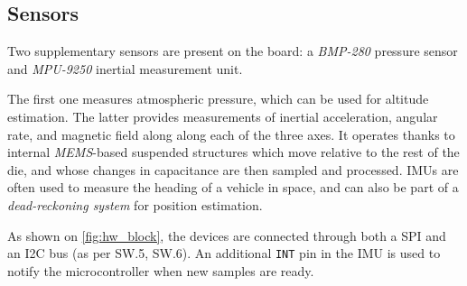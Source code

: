 \subsection{Sensors}

Two supplementary sensors are present on the board: a \emph{BMP-280} pressure sensor and \emph{MPU-9250} inertial measurement unit.

The first one measures atmospheric pressure, which can be used for altitude estimation.
The latter provides measurements of inertial acceleration, angular rate, and magnetic field along along each of the three axes.
It operates thanks to internal \emph{MEMS}-based suspended structures which move relative to the rest of the die, and whose changes in capacitance are then sampled and processed.
IMUs are often used to measure the heading of a vehicle in space, and can also be part of a \emph{dead-reckoning system} for position estimation.

As shown on \autoref{fig:hw_block}, the devices are connected through both a SPI and an I2C bus (as per SW.5, SW.6).
An additional \texttt{INT} pin in the IMU is used to notify the microcontroller when new samples are ready.
